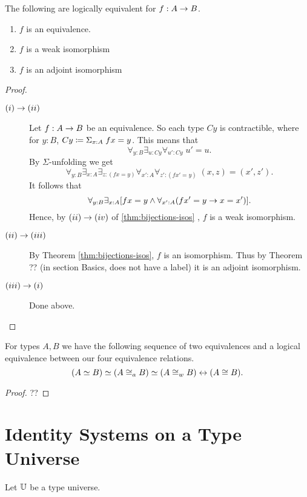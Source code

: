 \begin{thm}\label{thm:equiv-iso-adj} The following are logically equivalent for $f:A\rightarrow B$.
\begin{enumerate}
\item $f$ is an equivalence.
\item $f$ is a weak isomorphism
\item $f$ is an adjoint isomorphism
\end{enumerate}
\end{thm}
\begin{proof} $\;$

\begin{description}
\item[$(i)\rightarrow (ii)$] 
Let $f:A\rightarrow B$ be an equivalence.  So each type $Cy$ is contractible, where for $y:B$, $Cy \coloneqq \Sigma_{x:A}\; fx=y$.  This means that
  \[ \forall_{y:B}\exists_{u:Cy}\forall_{u':Cy}\; u'=u.\]
By $\Sigma$-unfolding we get
  \[ \forall_{y:B}\exists_{x:A}\exists_{z:(fx=y)}
                            \forall_{x':A}\forall_{z':(fx'=y)}\; (x,z)=(x',z').
  \]
It follows that
  \[ \forall_{y:B}\exists_{x:A}[fx=y\wedge\forall_{x':A}(fx'=y\rightarrow  x=x')].
  \]
Hence, by $(ii)\rightarrow (iv)$ of \autoref{thm:bijections-isos} , $f$ is a weak isomorphism.
\item[$(ii)\rightarrow (iii)$] By Theorem \ref{thm:bijections-isos}, $f$ is an isomorphism. Thus by Theorem ?? (in section Basics, does not have a label) it is an adjoint isomorphism.

\item[$(iii)\rightarrow (i)$] Done above.

\end{description}
\end{proof}
\begin{cor}\label{cor:equivs-equiv}
For types $A,B$ we have the following sequence of two equivalences and a logical equivalence
between our four equivalence relations.
  \[ (A \simeq B) \simeq (A\cong_a B) \simeq (A\cong_w B) \leftrightarrow (A\cong B).\]
\end{cor}
\begin{proof} ??

\end{proof}

\section{Identity Systems on a Type Universe}
\newcommand{\sfr}[1]{{{\sf r}_{#1}}}
Let $\mathbb{U}$ be a type universe.

